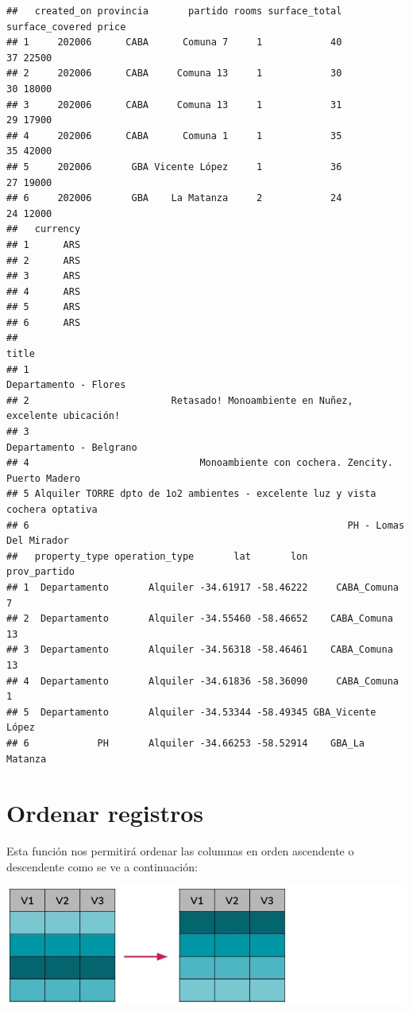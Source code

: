 \documentclass[
  spanish,
]{book}
\begin{document}
\begin{verbatim}
##   created_on provincia       partido rooms surface_total surface_covered price
## 1     202006      CABA      Comuna 7     1            40              37 22500
## 2     202006      CABA     Comuna 13     1            30              30 18000
## 3     202006      CABA     Comuna 13     1            31              29 17900
## 4     202006      CABA      Comuna 1     1            35              35 42000
## 5     202006       GBA Vicente López     1            36              27 19000
## 6     202006       GBA    La Matanza     2            24              24 12000
##   currency
## 1      ARS
## 2      ARS
## 3      ARS
## 4      ARS
## 5      ARS
## 6      ARS
##                                                                           title
## 1                                                         Departamento - Flores
## 2                         Retasado! Monoambiente en Nuñez, excelente ubicación!
## 3                                                       Departamento - Belgrano
## 4                              Monoambiente con cochera. Zencity. Puerto Madero
## 5 Alquiler TORRE dpto de 1o2 ambientes - excelente luz y vista cochera optativa
## 6                                                        PH - Lomas Del Mirador
##   property_type operation_type       lat       lon      prov_partido
## 1  Departamento       Alquiler -34.61917 -58.46222     CABA_Comuna 7
## 2  Departamento       Alquiler -34.55460 -58.46652    CABA_Comuna 13
## 3  Departamento       Alquiler -34.56318 -58.46461    CABA_Comuna 13
## 4  Departamento       Alquiler -34.61836 -58.36090     CABA_Comuna 1
## 5  Departamento       Alquiler -34.53344 -58.49345 GBA_Vicente López
## 6            PH       Alquiler -34.66253 -58.52914    GBA_La Matanza
\end{verbatim}

\hypertarget{ordenar-registros}{%
\section{Ordenar registros}\label{ordenar-registros}}

Esta función nos permitirá ordenar las columnas en orden ascendente o descendente como se ve a continuación:

\includegraphics{images/tidyverse_ordenar.jpg}
\end{document}

